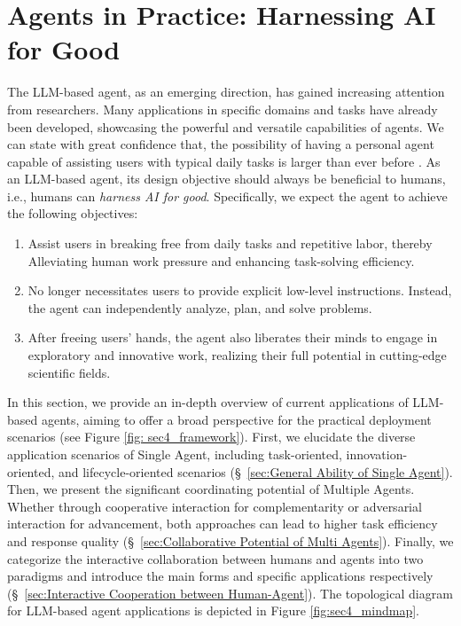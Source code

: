 \section{Agents in Practice:  Harnessing AI for Good}\label{sec:Agents in Practice:  Harnessing AI for Good}


The LLM-based agent, as an emerging direction, has gained increasing attention from researchers. Many applications in specific domains and tasks have already been developed, showcasing the powerful and versatile capabilities of agents. We can state with great confidence that, the possibility of having a personal agent capable of assisting users with typical daily tasks is larger than ever before \cite{DBLP:journals/corr/abs-2306-05152}. As an LLM-based agent, its design objective should always be beneficial to humans, i.e., humans can \textit{harness AI for good}. Specifically, we expect the agent to achieve the following objectives:

\begin{enumerate}[leftmargin=*]
    \item Assist users in breaking free from daily tasks and repetitive labor, thereby Alleviating human work pressure and enhancing task-solving efficiency.
    \item No longer necessitates users to provide explicit low-level instructions. Instead, the agent can independently analyze, plan, and solve problems.
    \item After freeing users' hands, the agent also liberates their minds to engage in exploratory and  innovative work, realizing their full potential in cutting-edge scientific fields.
\end{enumerate}

In this section, we provide an in-depth overview of current applications of LLM-based agents, aiming to offer a broad perspective for the practical deployment scenarios (see Figure \ref{fig: sec4_framework}). First, we elucidate the diverse application scenarios of Single Agent, including task-oriented, innovation-oriented, and lifecycle-oriented scenarios (\S \ \ref{sec:General Ability of Single Agent}). Then, we present the significant coordinating potential of Multiple Agents. Whether through cooperative interaction for complementarity or adversarial interaction for advancement, both approaches can lead to higher task efficiency and response quality (\S \ \ref{sec:Collaborative Potential of Multi Agents}). Finally, we categorize the interactive collaboration between humans and agents into two paradigms and introduce the main forms and specific applications respectively (\S \ \ref{sec:Interactive Cooperation between Human-Agent}). The topological diagram for LLM-based agent applications is depicted in Figure \ref{fig:sec4_mindmap}.


